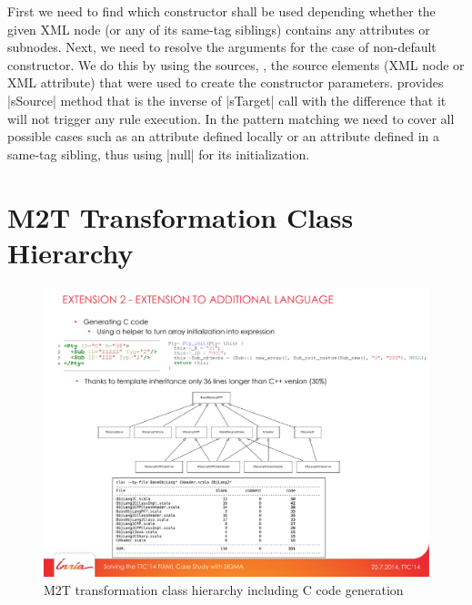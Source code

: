 First we need to find which constructor shall be used depending whether the given XML node (or any of its same-tag siblings) contains any attributes or subnodes.
Next, we need to resolve the arguments for the case of non-default constructor.
We do this by using the sources, \Ie, the source elements (XML node or XML attribute) that were used to create the constructor parameters.
\SIGMA provides \Scala|sSource| method that is the inverse of \Scala|sTarget| call with the difference that it will not trigger any rule execution.
In the pattern matching we need to cover all possible cases such as an attribute defined locally or an attribute defined in a same-tag sibling, thus using \Scala|null| for its initialization.


\section{M2T Transformation Class Hierarchy}
\label{sec:AppendixM2TClassHierarchy}

\begin{figure}[h!bt]
  \centering
  \includegraphics[width=\textwidth]{figures/M2TClassHierarchy.pdf}
  \caption{M2T transformation class hierarchy including C code generation}
  \label{fig:AppendixM2TClassHierarchy}
\end{figure}

